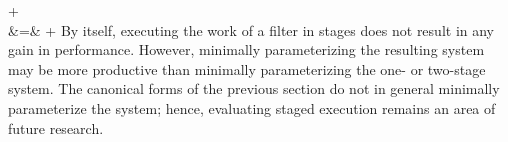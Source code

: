 + 
 \\
 &\hspace{-6pt}=\hspace{-6pt}& 
 +  
\doneeqnstar
\newpage
By itself, executing the work of a filter in stages does not result in
any gain in performance. However, minimally parameterizing the
resulting system may be more productive than minimally parameterizing
the one- or two-stage system.  The canonical forms of the previous
section do not in general minimally parameterize the system; hence,
evaluating staged execution remains an area of future research.

\newcommand{\IND}{\begin{ALC@g}}
\newcommand{\UND}{\end{ALC@g}}

